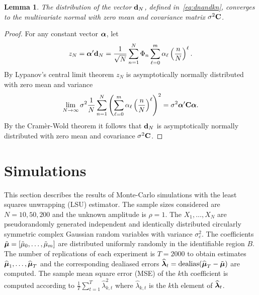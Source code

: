 \documentclass[aap,preprint]{imsart}
\newcommand{\var}{\operatorname{var}}
\newcommand{\covar}{\operatorname{covar}}
\newcommand{\dealias}{\operatorname{dealias}}
\newtheorem{lemma}{Lemma}
\begin{document}
\begin{lemma}\label{eq:convdn}
The distribution of the vector $\mathbf{d}_N$, defined in~\eqref{eq:dnandkn}, converges to the multivariate normal with zero mean and covariance matrix $\sigma^2\mathbf{C}$.
\end{lemma}
\begin{proof}
For any constant vector $\boldsymbol{\alpha}$, let
\[
z_N = \boldsymbol{\alpha}^\prime \mathbf{d}_N = \frac{1}{\sqrt{N}} \sum_{n=1}^{N} \Phi_n \sum_{\ell=0}^{m}\alpha_\ell\left( \frac{n}{N} \right)^\ell.
\]
By Lypanov's central limit theorem $z_N$ is asymptotically normally distributed with zero mean and variance
\[
\lim_{N\rightarrow\infty} \sigma^2 \frac{1}{N} \sum_{n=1}^{N}\left( \sum_{\ell=0}^{m}\alpha_\ell\left( \frac{n}{N} \right)^\ell \right)^2 = \sigma^2 \boldsymbol{\alpha}^\prime \mathbf{C} \boldsymbol{\alpha}.
\]
By the Cram\`{e}r-Wold theorem it follows that $\mathbf{d}_N$ is asymptotically normally distributed with zero mean and covariance $\sigma^2 \mathbf{C}$. 
\end{proof}

\section{Simulations}\label{sec:simulations} 
 
This section describes the results of Monte-Carlo simulations with the least squares unwrapping (LSU) estimator.  The sample sizes considered are $N = 10, 50, 200$ and the unknown amplitude is $\rho = 1$.  The $X_1, \dots, X_N$ are pseudorandomly generated independent and identically distributed circularly symmetric complex Gaussian random variables with variance $\sigma_c^2$.  The coefficients $\tilde{\boldsymbol{\mu}} = [\tilde{\mu}_0, \dots, \tilde{\mu}_m]$ are distributed uniformly randomly in the identifiable region $B$.  The number of replications of each experiment is $T = 2000$ to obtain estimates $\widehat{\boldsymbol{\mu}}_1, \dots, \widehat{\boldsymbol{\mu}}_T$ and the corresponding dealiased errors $\widehat{\lambdabf}_t = \dealias(\widehat{\mubf}_T - \tilde{\mubf})$ are computed.  The sample mean square error (MSE) of the $k$th coefficient is computed according to $\tfrac{1}{T}\sum_{t=1}^T \widehat{\lambda}_{k,t}^2$ where $\widehat{\lambda}_{k,t}$ is the $k$th element of $\widehat{\boldsymbol{\lambda}}_t$. 
\end{document}
